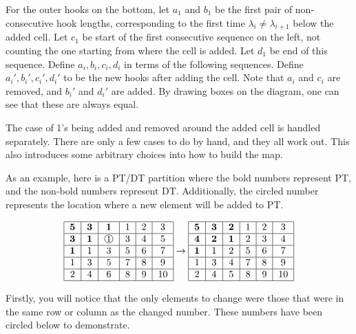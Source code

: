 \documentclass{amsart}
\theoremstyle{definition}
\newcommand{\cir}[1]{\raisebox{.5pt}{\textcircled{\raisebox{-.9pt} {#1}}}}
\begin{document}
For the outer hooks on the bottom, let $a_1$ and $b_1$ be the first
pair of non-consecutive hook lengths, corresponding to the first time
$\lambda_i \neq \lambda_{i+1}$ below the added cell.  Let $c_1$ be
start of the first consecutive sequence on the left, not counting the
one starting from where the cell is added.  Let $d_1$ be end of this
sequence.  Define $a_i, b_i, c_i, d_i$ in terms of the following
sequences.  Define $a_i', b_i', c_i', d_i'$ to be the new hooks after
adding the cell.  Note that $a_i$ and $c_i$ are removed, and $b_i'$
and $d_i'$ are added.  By drawing boxes on the diagram, one can see
that these are always equal.

The case of 1's being added and removed around the added cell is
handled separately.  There are only a few cases to do by hand, and
they all work out.  This also introduces some arbitrary choices into
how to build the map.

As an example, here is a PT/DT partition where the bold numbers represent PT, and the non-bold numbers represent DT.  Additionally, the circled number represents the location where a new element will be added to PT.
\begin{figure}[h]
	\[
	\begin{tabular}{|c|c|c|c|c|c|}
		\hline
		$\mathbf{5}$&$\mathbf{3}$&$\mathbf{1}$&1&2&3\\
		\hline
		$\mathbf{3}$&$\mathbf{1}$&$\cir{1}$&3&4&5\\
		\hline
		$\mathbf{1}$&1&3&5&6&7\\
		\hline
		1&3&5&7&8&9\\
		\hline
		2&4&6&8&9&10\\
		\hline
	\end{tabular}
	\rightarrow
	\begin{tabular}{|c|c|c|c|c|c|}
		\hline
		$\mathbf{5}$&$\mathbf{3}$&$\mathbf{2}$&1&2&3\\
		\hline
		$\mathbf{4}$&$\mathbf{2}$&$\mathbf{1}$&2&3&4\\
		\hline
		$\mathbf{1}$&1&2&5&6&7\\
		\hline
		1&3&4&7&8&9\\
		\hline
		2&4&5&8&9&10\\
		\hline
	\end{tabular}
	\]
\end{figure}

Firstly, you will notice that the only elements to change were those that were in the same row or column as the changed number.  These numbers have been circled below to demonstrate.
\end{document}
